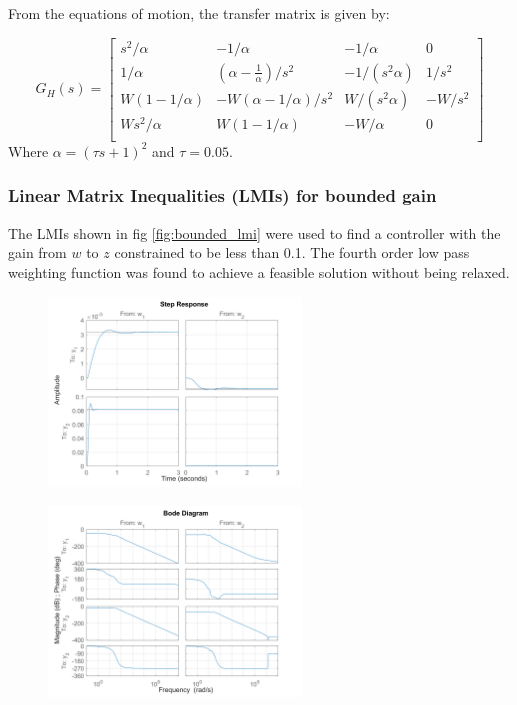 \documentclass{article}
\begin{document}
From the equations of motion, the transfer matrix is given by:

\begin{equation}
    G_H(s) = \begin{bmatrix}
        s^2/\alpha & -1/\alpha & -1/\alpha & 0 \\
        1/\alpha & \left(\alpha - \frac{1}{\alpha}\right)/s^2 & - 1/(s^2 \alpha) & 1/s^2 \\
        W\left(1 - 1/\alpha \right) & - W\left( \alpha- 1/\alpha \right)/s^2 & W / (s^2 \alpha) & - W/s^2 \\
        W s^2 / \alpha & W(1 - 1/\alpha) & - W/\alpha & 0 \\
    \end{bmatrix}
\end{equation}
Where $\alpha = (\tau s + 1)^2$ and $\tau = 0.05$.

\subsubsection{Linear Matrix Inequalities (LMIs) for bounded gain}

The LMIs shown in fig \ref{fig:bounded_lmi} were used to find a controller with the gain from $w$ to $z$ constrained to be less than 0.1.
The fourth order low pass weighting function was found to achieve a feasible solution without being relaxed.

\begin{figure}[H]
    \centering
    \includegraphics[width=0.6\textwidth]{figures/K_g_step.png}
    \caption{}
\end{figure}

\begin{figure}[H]
    \centering
    \includegraphics[width=0.6\textwidth]{figures/K_g_bode.png}
    \caption{}
\end{figure}
\end{document}
